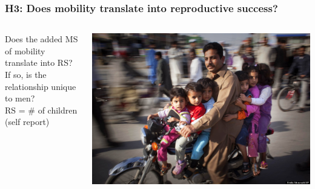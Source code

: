 \documentclass{beamer}
\begin{document}
\begin{frame}
\begin{columns}

\end{columns}

\end{frame}


\begin{frame}
\frametitle{H3: Does mobility translate into reproductive success?}

\begin{columns}
\begin{column}{.5\textwidth}
Does the added MS of mobility translate into RS? \\
\vspace{0.75cm} 
If so, is the relationship unique to men? \\
\vspace{0.75cm} 
RS = \# of children (self report)

\end{column}

\begin{column}{.5\textwidth}
\includegraphics[width= 1\textwidth]{travelrs}
\end{column}

\end{columns}

\end{frame}

\end{document}
